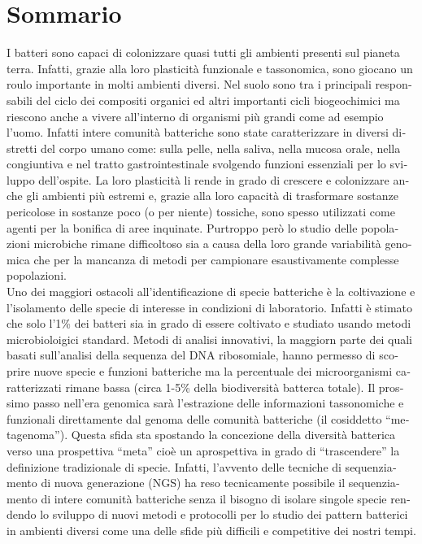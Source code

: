 \chapter{Sommario}
\begin{otherlanguage}{italian}

I batteri sono capaci di colonizzare quasi tutti gli ambienti presenti sul pianeta terra. Infatti, grazie alla loro plasticità funzionale e tassonomica, sono giocano un roulo importante in molti ambienti diversi. Nel suolo sono tra i principali responsabili del ciclo dei compositi organici ed altri importanti cicli biogeochimici ma riescono anche a vivere all'interno di organismi più grandi come ad esempio l'uomo. Infatti intere comunità batteriche sono state caratterizzare in diversi distretti del corpo umano come: sulla pelle, nella saliva, nella mucosa orale, nella congiuntiva e nel tratto gastrointestinale svolgendo funzioni essenziali per lo sviluppo dell'ospite. La loro plasticità li rende in grado di crescere e colonizzare anche gli ambienti più estremi e, grazie alla loro capacità di trasformare sostanze pericolose in sostanze poco (o per niente) tossiche, sono spesso utilizzati come agenti per la bonifica di aree inquinate. Purtroppo però lo studio delle popolazioni microbiche rimane difficoltoso sia a causa della loro grande variabilità genomica che per la mancanza di metodi per campionare esaustivamente complesse popolazioni.\\
Uno dei maggiori ostacoli all'identificazione di specie batteriche è la coltivazione e l'isolamento delle specie di interesse in condizioni di laboratorio. Infatti è stimato che solo l'1\% dei batteri sia in grado di essere coltivato e studiato usando metodi microbioloigici standard. Metodi di analisi innovativi, la maggiorn parte dei quali basati sull'analisi della sequenza del DNA ribosomiale, hanno permesso di scoprire nuove specie e funzioni batteriche ma la percentuale dei microorganismi caratterizzati rimane bassa (circa 1-5\% della biodiversità batterca totale). Il prossimo passo nell'era genomica sarà l'estrazione delle informazioni tassonomiche e funzionali direttamente dal genoma delle comunità batteriche (il cosiddetto ``metagenoma''). Questa sfida sta spostando la concezione della diversità batterica verso una prospettiva ``meta'' cioè un aprospettiva in grado di ``trascendere'' la definizione tradizionale di specie. Infatti, l'avvento delle tecniche di sequenziamento di nuova generazione (NGS) ha reso tecnicamente possibile il sequenziamento di intere comunità batteriche senza il bisogno di isolare singole specie rendendo lo sviluppo di nuovi metodi e protocolli per lo studio dei pattern batterici in ambienti diversi come una delle sfide più difficili e competitive dei nostri tempi.\\

\end{otherlanguage}
